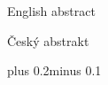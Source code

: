 \documentclass[11pt,twoside,a4paper]{book}
\begin{document}





\abstractpage
English abstract


\baselineskip

\noindent
Český abstrakt


\noindent




\setcounter{secnumdepth}{2}
\setcounter{tocdepth}{1}
\tableofcontents


\listoffigures




\mainbodystarts
\normalfont
{}\baselineskip plus 0.2\baselineskip minus 0.1\baselineskip



\end{document}
